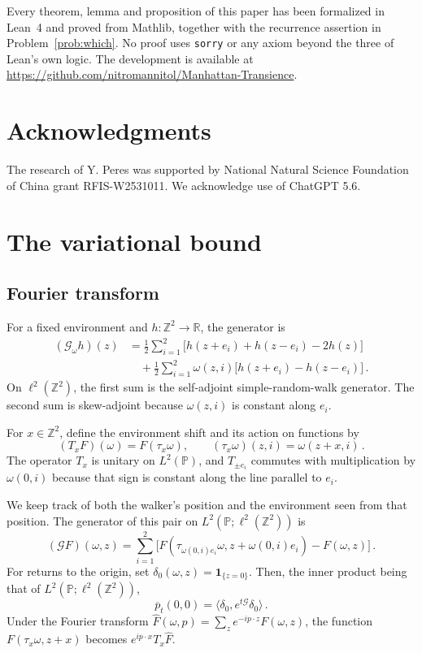\documentclass[11pt]{amsart}
\theoremstyle{plain}
\theoremstyle{definition}
\newcommand{\Z}{\mathbb Z}
\newcommand{\R}{\mathbb R}
\renewcommand{\P}{\mathbb P}
\newcommand{\1}{\mathbf 1}
\newcommand{\ip}[2]{\langle #1,#2\rangle}
\begin{document}
	Every theorem, lemma and proposition of this paper has been formalized
	in Lean~4 and proved from Mathlib, together with the recurrence assertion
	in Problem~\ref{prob:which}.  No proof uses \texttt{sorry} or any axiom
	beyond the three of Lean's own logic.  The development is available at
	\url{https://github.com/nitromannitol/Manhattan-Transience}.
	
	\section*{Acknowledgments}
	The research of Y. Peres was supported by National Natural Science Foundation of China grant
	RFIS-W2531011.  We acknowledge use of ChatGPT 5.6.
	
	\section{The variational bound}\label{sec:variational}
	
	\subsection{Fourier transform}\label{ssec:fourier}
	
	For a fixed environment and $h\colon\Z^2\to\R$, the generator is
	\begin{equation}\label{eq:discrete-drift}
		\begin{split}
			(\mathcal G_\omega h)(z)
			&=\frac12\sum_{i=1}^2
			\bigl[h(z+e_i)+h(z-e_i)-2h(z)\bigr]\\
			&\quad+\frac12\sum_{i=1}^2\omega(z,i)
			\bigl[h(z+e_i)-h(z-e_i)\bigr]\, .
		\end{split}
	\end{equation}
	On $\ell^2(\Z^2)$, the first sum is the self-adjoint simple-random-walk
	generator.  The second sum is skew-adjoint because $\omega(z,i)$ is
	constant along $e_i$.
	
	For $x\in\Z^2$, define the environment shift and its action on functions by
	\[
	(T_xF)(\omega)=F(\tau_x\omega),\qquad
	(\tau_x\omega)(z,i)=\omega(z+x,i)\, .
	\]
	The operator $T_x$ is unitary on $L^2(\P)$, and $T_{\pm e_i}$ commutes
	with multiplication by $\omega(0,i)$ because that sign is constant along
	the line parallel to $e_i$.
	
	We keep track of both the walker's position and the environment seen
	from that position.  The generator of this pair on
	$L^2(\P;\ell^2(\Z^2))$ is
	\begin{equation}\label{eq:joint-generator}
		(\mathcal GF)(\omega,z)=\sum_{i=1}^2
		\bigl[F(\tau_{\omega(0,i)e_i}\omega,z+\omega(0,i)e_i)-F(\omega,z)\bigr]\, .
	\end{equation}
	For returns to the origin, set
	$\delta_0(\omega,z)=\1_{\{z=0\}}$.  Then, the inner product being that of
	$L^2(\P;\ell^2(\Z^2))$,
	\begin{equation}\label{eq:return-correlation}
		\overline p_t(0,0)=\ip{\delta_0}{e^{t\mathcal G}\delta_0}\, .
	\end{equation}
	Under the Fourier transform
	$\widehat F(\omega,p)=\sum_z e^{-ip\cdot z}F(\omega,z)$, the function
	$F(\tau_x\omega,z+x)$ becomes $e^{ip\cdot x}T_x\widehat F$.
	
\end{document}
